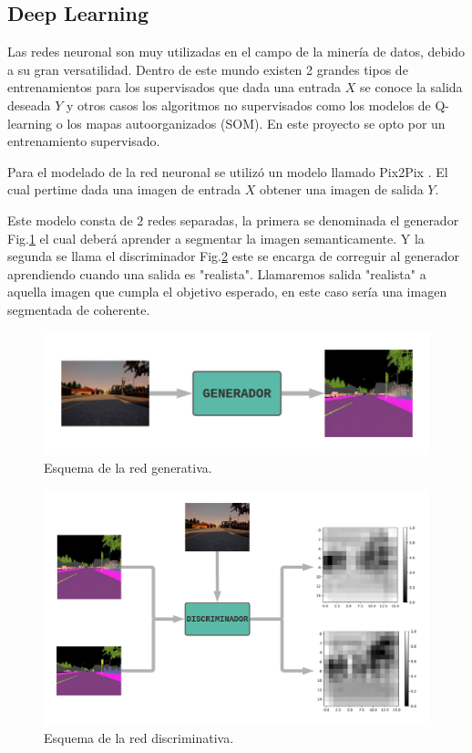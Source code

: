 \documentclass[]{IEEEtran}
\begin{document}
    \subsection{Deep Learning}

    Las redes neuronal son muy utilizadas en el campo de la minería de datos, debido a 
    su gran versatilidad. Dentro de este mundo existen 2 grandes tipos de entrenamientos 
    para los supervisados que dada una entrada $X$ se conoce la salida deseada $Y$ y 
    otros casos los algoritmos no supervisados como los modelos de Q-learning o los mapas autoorganizados (SOM).
    En este proyecto se opto por un entrenamiento supervisado.

    

    Para el modelado de la red neuronal se utilizó un modelo llamado Pix2Pix \cite{Pix2Pix}.
    El cual pertime dada una imagen de entrada $X$ obtener una imagen de salida $Y$.

    Este modelo consta de $2$ redes separadas, la primera se denominada el generador Fig.\ref{fig:generator}
    el cual deberá aprender a segmentar la imagen semanticamente. Y la segunda se llama el discriminador Fig.\ref{fig:discr}
    este se encarga de correguir al generador aprendiendo cuando una salida es "realista". 
    Llamaremos salida "realista" a aquella imagen que cumpla el objetivo esperado, en este caso sería una imagen segmentada 
    de coherente.
    
    \begin{figure}
        \centering
        \includegraphics[width=.4\textwidth]{Imgs/Generador.png}
        \caption{Esquema de la red generativa.}
        \label{fig:generator}
    \end{figure}

    \begin{figure}
        \centering
        \includegraphics[width=.4\textwidth]{Imgs/Discriminador.png}
        \caption{Esquema de la red discriminativa.}
        \label{fig:discr}
    \end{figure}
    
\end{document}
